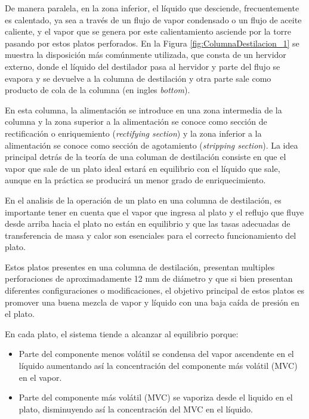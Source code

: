 \documentclass[11pt]{book}
\begin{document}
De manera paralela, en la zona inferior, el líquido que desciende, frecuentemente es calentado, ya sea a través de un flujo de vapor condensado o un flujo de aceite caliente, y el vapor que se genera por este calientamiento asciende por la torre pasando por estos platos perforados. En la Figura \ref{fig:ColumnaDestilacion_1} se muestra la disposición más comúnmente utilizada, que consta de un hervidor externo, donde el líquido del destilador pasa al hervidor y parte del flujo se evapora y se devuelve a la columna de destilación y otra parte sale como producto de cola de la columna (en ingles \textit{bottom}).

En esta columna, la alimentación se introduce en una zona intermedia de la columna y la zona superior a la alimentación se conoce como sección de rectificación o enriquemiento (\textit{rectifying section}) y la zona inferior a la alimentación se conoce como sección de agotamiento (\textit{stripping section}). La idea principal detrás de la teoría de una columan de destilación consiste en que el vapor que sale de un plato ideal estará en equilibrio con el líquido que sale, aunque en la práctica se producirá un menor grado de enriquecimiento.

En el analisis de la operación de un plato en una columna de destilación, es importante tener en cuenta que el vapor que ingresa al plato y el reflujo que fluye desde arriba hacia el plato no están en equilibrio y que las tasas adecuadas de transferencia de masa y calor son esenciales para el correcto funcionamiento del plato.

Estos platos presentes en una columna de destilación, presentan multiples perforaciones de aproximadamente 12 mm de diámetro y que si bien presentan diferentes configuraciones o modificaciones, el objetivo principal de estos platos es promover una buena mezcla de vapor y líquido con una baja caída de presión en el plato.

En cada plato, el sistema tiende a alcanzar al equilibrio porque:

\begin{itemize}
    \item Parte del componente menos volátil se condensa del vapor ascendente en el líquido aumentando así la concentración del componente más volátil (MVC) en el vapor.
    
    \item Parte del componente más volátil (MVC) se vaporiza desde el liquido en el plato, disminuyendo así la concentración del MVC en el líquido. 
\end{itemize}
\end{document}
